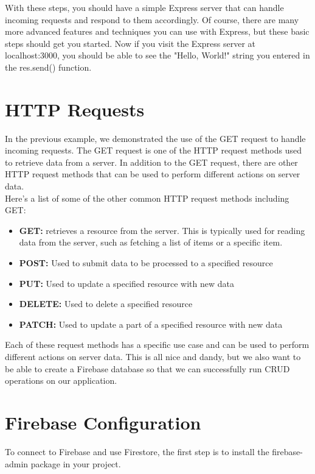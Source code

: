 \documentclass{article}
\begin{document}
With these steps, you should have a simple Express server that can handle incoming requests and respond to them accordingly. Of course, there are many more advanced features and techniques you can use with Express, but these basic steps should get you started.
Now if you visit the Express server at localhost:3000, you should be able to see the "Hello, World!" string you entered in the res.send() function.



\section{\centering HTTP Requests}
In the previous example, we demonstrated the use of the GET request to handle incoming requests. The GET request is one of the HTTP request methods used to retrieve data from a server. In addition to the GET request, there are other HTTP request methods that can be used to perform different actions on server data.\\ 

Here's a list of some of the other common HTTP request methods including GET:
\begin{itemize}
    \item \textbf{GET:} retrieves a resource from the server. This is typically used for reading data from the server, such as fetching a list of items or a specific item.
    \item \textbf{POST:} Used to submit data to be processed to a specified resource
    \item \textbf{PUT:} Used to update a specified resource with new data
    \item \textbf{DELETE:} Used to delete a specified resource
    \item \textbf{PATCH:} Used to update a part of a specified resource with new data
\end{itemize}
Each of these request methods has a specific use case and can be used to perform different actions on server data.
This is all nice and dandy, but we also want to be able to create a Firebase database so that we can successfully run CRUD operations on our application.

\newpage
\section{\centering Firebase Configuration}

To connect to Firebase and use Firestore, the first step is to install the firebase-admin package in your project.\\
\end{document}
